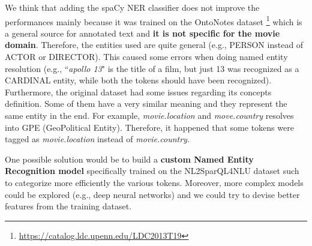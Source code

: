 \documentclass[11pt,a4paper]{article}
\begin{document}
We think that adding the spaCy NER classifier does not improve the performances mainly because it was trained on the OntoNotes dataset \footnote{\url{https://catalog.ldc.upenn.edu/LDC2013T19}} which is a general source for annotated text and \textbf{it is not specific for the movie domain}. Therefore, the entities used are quite general (e.g., PERSON instead of ACTOR or DIRECTOR). This caused some errors when doing named entity resolution (e.g., ``\textit{apollo 13}" is the title of a film, but just 13 was recognized as a CARDINAL entity, while both the tokens should have been recognized).
Furthermore, the original dataset had some issues regarding its concepts definition. Some of them have a very similar meaning and they represent the same entity in the end. For example, \textit{movie.location} and \textit{move.country} resolves into GPE (GeoPolitical Entity). Therefore, it happened that some tokens were tagged as \textit{movie.location} instead of \textit{movie.country}. 
 
One possible solution would be to build a \textbf{custom Named Entity Recognition model} specifically trained on the NL2SparQL4NLU dataset such to categorize more efficiently the various tokens. Moreover, more complex models \citep{gobbi2018concept} could be explored (e.g., deep neural networks)  and we could try to devise better features from the training dataset.



\end{document}
